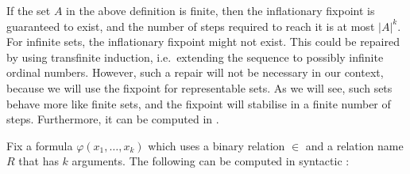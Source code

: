 If the set $A$ in the above definition is finite, then the inflationary fixpoint is guaranteed to exist, and the number of steps required to reach it is at most $|A|^k$. For infinite sets, the inflationary fixpoint might not exist. This could be repaired by using transfinite induction, i.e.~extending the sequence to possibly infinite ordinal numbers. However, such a repair will not be necessary in our context, because we will use the fixpoint for representable sets. As we will see, such sets behave more like finite sets, and the fixpoint will stabilise in a finite number of steps. Furthermore, it can be computed in \fdp. 




\begin{theorem}\label{thm:fdp-fixpoint}
    Fix a formula $\varphi(x_1,\ldots,x_k)$ which uses a binary relation $\in$ and a relation name $R$ that has $k$ arguments. The following can be computed in syntactic \fdp: 
\end{theorem}

